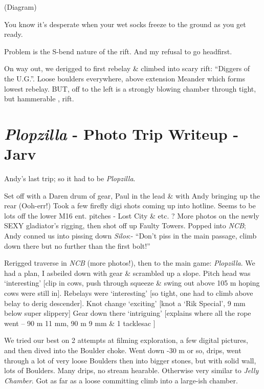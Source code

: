 (Diagram)

You know it's desperate when your wet socks freeze to the ground as you
get ready.

Problem is the S-bend nature of the rift. And my refusal to go
headfirst.

On way out, we derigged to first rebelay \& climbed into scary rift:
``Diggers of the U.G.''. Loose boulders everywhere, above extension
Meander which forms lowest rebelay. BUT, off to the left is a strongly
blowing chamber through tight, but hammerable , rift.

\hypertarget{plopzilla---photo-trip-writeup---jarv}{%
\section{\texorpdfstring{\emph{Plopzilla} - Photo Trip Writeup -
Jarv}{Plopzilla - Photo Trip Writeup - Jarv}}\label{plopzilla---photo-trip-writeup---jarv}}

Andy's last trip; so it had to be \emph{Plopzilla}.

Set off with a Daren drum of gear, Paul in the lead \& with Andy
bringing up the rear (Ooh-err!) Took a few firefly digi shots coming up
into hotline. Seems to be lots off the lower M16 ent. pitches - Lost
City \& etc. ? More photos on the newly SEXY gladiator's rigging, then
shot off up Faulty Towers. Popped into \emph{NCB}; Andy conned us into
pissing down \emph{Silos}:- ``Don't piss in the main passage, climb down
there but no further than the first bolt!''

Rerigged traverse in \emph{NCB} (more photos!), then to the main game:
\emph{Plopzilla}. We had a plan, I asbeiled down with gear \& scrambled
up a slope. Pitch head was `interesting' {[}clip in cows, push through
squeeze \& swing out above 105 m hoping cows were still in{]}. Rebelays
were `interesting' {[}so tight, one had to climb above belay to derig
descender{]}. Knot change `exciting' {[}knot a `Rik Special', 9 mm below
super slippery{]} Gear down there `intriguing' {[}explains where all the
rope went -- 90 m 11 mm, 90 m 9 mm \& 1 tacklesac {]}

We tried our best on 2 attempts at filming exploration, a few digital
pictures, and then dived into the Boulder choke. Went down -30 m or so,
drips, went through a lot of very loose Boulders then into bigger
stones, but with solid wall, lots of Boulders. Many drips, no stream
hearable. Otherwise very similar to \emph{Jelly Chamber}. Got as far as
a loose committing climb into a large-ish chamber.

